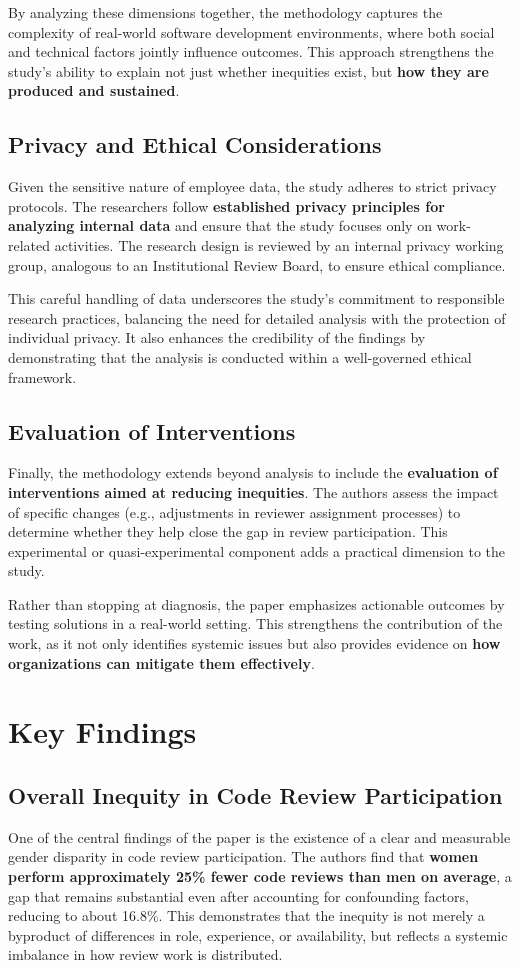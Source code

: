By analyzing these dimensions together, the methodology captures the complexity of real-world software development environments, where both social and technical factors jointly influence outcomes. This approach strengthens the study’s ability to explain not just whether inequities exist, but \textbf{how they are produced and sustained}.

\subsection{Privacy and Ethical Considerations}
Given the sensitive nature of employee data, the study adheres to strict privacy protocols. The researchers follow \textbf{established privacy principles for analyzing internal data} and ensure that the study focuses only on work-related activities. The research design is reviewed by an internal privacy working group, analogous to an Institutional Review Board, to ensure ethical compliance.

This careful handling of data underscores the study’s commitment to responsible research practices, balancing the need for detailed analysis with the protection of individual privacy. It also enhances the credibility of the findings by demonstrating that the analysis is conducted within a well-governed ethical framework.


\subsection{Evaluation of Interventions}
Finally, the methodology extends beyond analysis to include the \textbf{evaluation of interventions aimed at reducing inequities}. The authors assess the impact of specific changes (e.g., adjustments in reviewer assignment processes) to determine whether they help close the gap in review participation. This experimental or quasi-experimental component adds a practical dimension to the study.

Rather than stopping at diagnosis, the paper emphasizes actionable outcomes by testing solutions in a real-world setting. This strengthens the contribution of the work, as it not only identifies systemic issues but also provides evidence on \textbf{how organizations can mitigate them effectively}.

\section{Key Findings}
\subsection{Overall Inequity in Code Review Participation}
One of the central findings of the paper is the existence of a clear and measurable gender disparity in code review participation. The authors find that \textbf{women perform approximately 25\% fewer code reviews than men on average}, a gap that remains substantial even after accounting for confounding factors, reducing to about 16.8\%. This demonstrates that the inequity is not merely a byproduct of differences in role, experience, or availability, but reflects a systemic imbalance in how review work is distributed.

